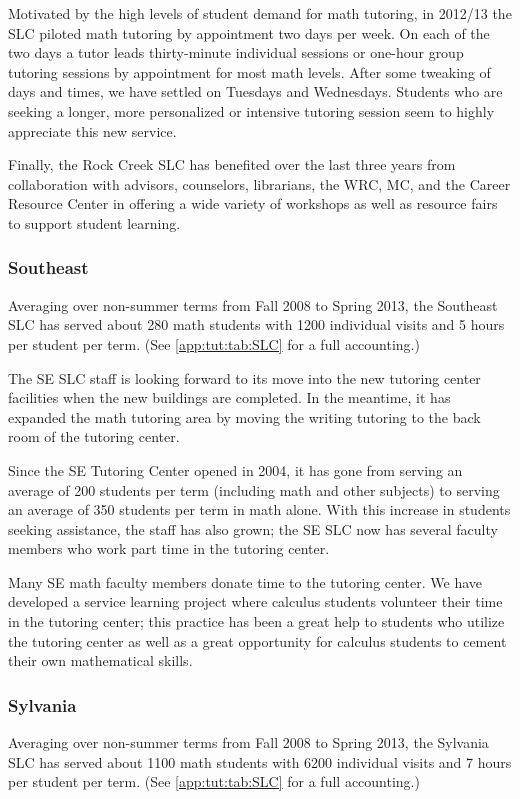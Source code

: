 Motivated by the high levels of student demand for math tutoring, in 2012/13 the SLC piloted math tutoring by appointment two days per week.
On each of the two days a tutor leads thirty-minute individual sessions or one-hour group tutoring sessions by appointment for most math levels.
After some tweaking of days and times, we have settled on Tuesdays and Wednesdays.
Students who are seeking a longer, more personalized or intensive tutoring session seem to highly appreciate this new service.

Finally, the Rock Creek SLC has benefited over the last three years from collaboration with advisors, counselors, librarians, the WRC, MC, and the Career Resource Center in offering a wide variety of workshops as well as resource fairs to support student learning.

\subsubsection{Southeast}
Averaging over non-summer terms from Fall 2008 to Spring 2013, the Southeast SLC has served about 280 math students with 1200 individual visits and 5 hours per student per term.
(See \vref{app:tut:tab:SLC} for a full accounting.)

The SE SLC staff is looking forward to its move into the new tutoring center facilities when the new buildings are completed.
In the meantime, it has expanded the math tutoring area by moving the writing tutoring to the back room of the tutoring center.

Since the SE Tutoring Center opened in 2004, it has gone from serving an average of 200 students per term (including math and other subjects) to serving an average of 350 students per term in math alone.
With this increase in students seeking assistance, the staff has also grown; the SE SLC now has several faculty members who work part time in the tutoring center.

Many SE math faculty members donate time to the tutoring center.
We have developed a service learning project where calculus students volunteer their time in the tutoring center; this practice has been a great help to students who utilize the tutoring center as well as a great opportunity for calculus students to cement their own mathematical skills.

\subsubsection{Sylvania}
Averaging over non-summer terms from Fall 2008 to Spring 2013, the Sylvania SLC has served about 1100 math students with 6200 individual visits and 7 hours per student per term.
(See \vref{app:tut:tab:SLC} for a full accounting.)

